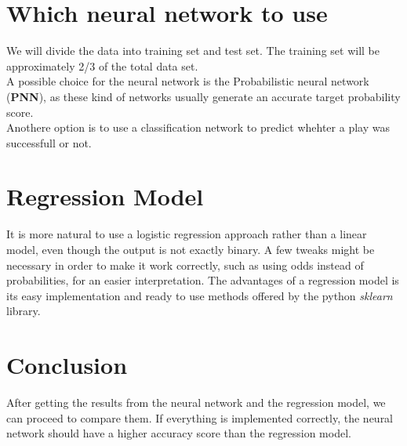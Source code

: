 \documentclass{article}
\begin{document}
\section{Which neural network to use}
We will divide the data into training set and test set. The training set will be approximately 2/3 of the total data set.  \\
A possible choice for the neural network is the Probabilistic neural network (\textbf{PNN}), as these kind of networks usually generate an accurate target probability score.\\
Anothere option is to use a classification network to predict whehter a play was successfull or not.
\section{Regression Model}
It is more natural to use a logistic regression approach rather than a linear model, even though the output is not exactly binary. A few tweaks might be necessary in order to make it work correctly, such as using odds instead of probabilities, for an easier interpretation.
The advantages of a regression model is its easy implementation and ready to use methods offered by the python \textit{sklearn} library.
\section{Conclusion}
After getting the results from the neural network and the regression model, we can proceed to compare them. If everything is implemented correctly, the neural network should have a higher accuracy score than the regression model.
\end{document}
